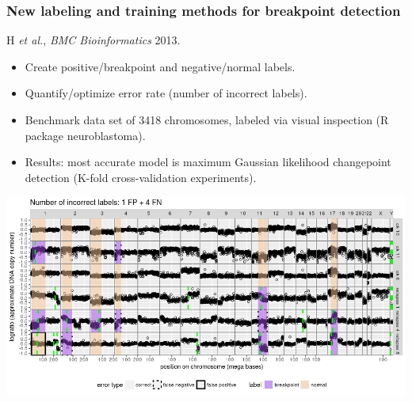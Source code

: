 \documentclass{beamer}
\begin{document}
\begin{frame}
  \frametitle{New labeling and training methods for breakpoint detection}

  H {\it et al.}, {\it BMC Bioinformatics} 2013.
  \begin{itemize}
  \item Create positive/breakpoint and negative/normal labels.
  \item Quantify/optimize error rate (number of incorrect labels).
  \item Benchmark data set of 3418 chromosomes,
    labeled via visual inspection (R package neuroblastoma).
  \item Results: most accurate model is maximum Gaussian likelihood 
    changepoint detection (K-fold cross-validation experiments).
  \end{itemize}

  \includegraphics[width=\textwidth]{neuroblastoma-ok-relapse-supervised}

\end{frame}
\end{document}
